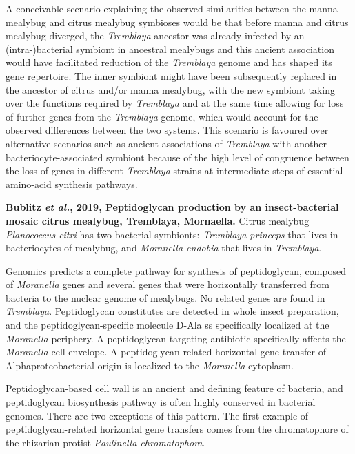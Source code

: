 \documentclass[11pt]{article}
\begin{document}
\begin{sloppypar}
\par
A conceivable scenario explaining the observed similarities between the manna mealybug and citrus mealybug symbioses would be that before manna and citrus mealybug diverged, the \textit{Tremblaya} ancestor was already infected by an (intra-)bacterial symbiont in ancestral mealybugs and this ancient association would have facilitated reduction of the \textit{Tremblaya} genome and has shaped its gene repertoire. 
The inner symbiont might have been subsequently replaced in the ancestor of citrus and/or manna mealybug, with the new symbiont taking over the functions required by \textit{Tremblaya} and at the same time allowing for loss of further genes from the \textit{Tremblaya} genome, which would account for the observed differences between the two systems.
This scenario is favoured over alternative scenarios such as ancient associations of \textit{Tremblaya} with another bacteriocyte-associated symbiont because of the high level of congruence between the loss of genes in different \textit{Tremblaya} strains at intermediate steps of essential amino-acid synthesis pathways. 
\par
\textbf{Bublitz \textit{et al.}, 2019, Peptidoglycan production by an insect-bacterial mosaic citrus mealybug, Tremblaya, Mornaella.} \newline
Citrus mealybug \textit{Planococcus citri} has two bacterial symbionts: \textit{Tremblaya princeps} that lives in bacteriocytes of mealybug, and \textit{Moranella endobia} that lives in \textit{Tremblaya}. 
\par
Genomics predicts a complete pathway for synthesis of peptidoglycan, composed of \textit{Moranella} genes and several genes that were horizontally transferred from bacteria to the nuclear genome of mealybugs. 
No related genes are found in \textit{Tremblaya}. 
Peptidoglycan constitutes are detected in whole insect preparation, and the peptidoglycan-specific molecule D-Ala ss specifically localized at the \textit{Moranella} periphery. 
A peptidoglycan-targeting antibiotic specifically affects the \textit{Moranella} cell envelope. 
A peptidoglycan-related horizontal gene transfer of Alphaproteobacterial origin is localized to the \textit{Moranella} cytoplasm.
\par
Peptidoglycan-based cell wall is an ancient and defining feature of bacteria, and peptidoglycan biosynthesis pathway is often highly conserved in bacterial genomes. 
There are two exceptions of this pattern. 
The first example of peptidoglycan-related horizontal gene transfers comes from the chromatophore of the rhizarian protist \textit{Paulinella chromatophora}. 

\end{sloppypar}
\end{document}
